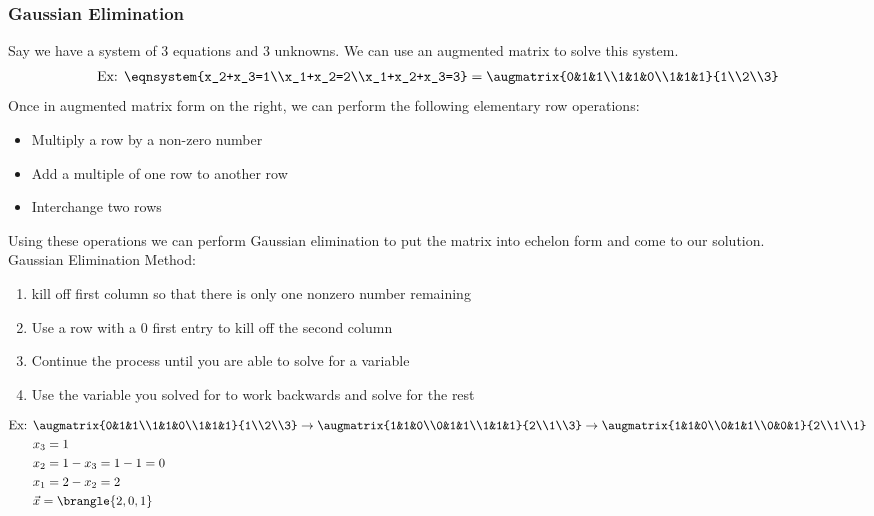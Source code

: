 \subsubsection{Gaussian Elimination}
Say we have a system of 3 equations and 3 unknowns. We can use an augmented matrix to solve this system.
\begin{align*}
    \text{Ex: }\eqnsystem{x_2+x_3=1\\x_1+x_2=2\\x_1+x_2+x_3=3}=\augmatrix{0&1&1\\1&1&0\\1&1&1}{1\\2\\3}
\end{align*}
Once in augmented matrix form on the right, we can perform the following elementary row operations:
\begin{itemize}
    \item Multiply a row by a non-zero number
    \item Add a multiple of one row to another row
    \item Interchange two rows
\end{itemize}
Using these operations we can perform Gaussian elimination to put the matrix into echelon form and come to our solution.\\
Gaussian Elimination Method:
\begin{enumerate}
    \item kill off first column so that there is only one nonzero number remaining
    \item Use a row with a 0 first entry to kill off the second column
    \item Continue the process until you are able to solve for a variable
    \item Use the variable you solved for to work backwards and solve for the rest
\end{enumerate}
\begin{align*}
    \text{Ex: }&\augmatrix{0&1&1\\1&1&0\\1&1&1}{1\\2\\3}\to\augmatrix{1&1&0\\0&1&1\\1&1&1}{2\\1\\3}\to\augmatrix{1&1&0\\0&1&1\\0&0&1}{2\\1\\1}\\
    &x_3=1\\
    &x_2=1-x_3=1-1=0\\
    &x_1=2-x_2=2\\
    &\vec{x}=\brangle{2,0,1}
\end{align*}

